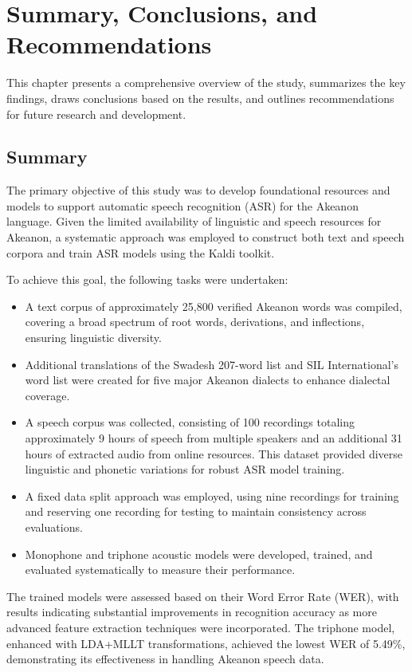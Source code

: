 \chapter{Summary, Conclusions, and Recommendations}

This chapter presents a comprehensive overview of the study, summarizes the key findings, draws conclusions based on the results, and outlines recommendations for future research and development.

\section{Summary}

The primary objective of this study was to develop foundational resources and models to support automatic speech recognition (ASR) for the Akeanon language. Given the limited availability of linguistic and speech resources for Akeanon, a systematic approach was employed to construct both text and speech corpora and train ASR models using the Kaldi toolkit.

To achieve this goal, the following tasks were undertaken:

\begin{itemize} \item A text corpus of approximately 25,800 verified Akeanon words was compiled, covering a broad spectrum of root words, derivations, and inflections, ensuring linguistic diversity. \item Additional translations of the Swadesh 207-word list and SIL International’s word list were created for five major Akeanon dialects to enhance dialectal coverage. \item A speech corpus was collected, consisting of 100 recordings totaling approximately 9 hours of speech from multiple speakers and an additional 31 hours of extracted audio from online resources. This dataset provided diverse linguistic and phonetic variations for robust ASR model training. \item A fixed data split approach was employed, using nine recordings for training and reserving one recording for testing to maintain consistency across evaluations. \item Monophone and triphone acoustic models were developed, trained, and evaluated systematically to measure their performance. \end{itemize}

The trained models were assessed based on their Word Error Rate (WER), with results indicating substantial improvements in recognition accuracy as more advanced feature extraction techniques were incorporated. The triphone model, enhanced with LDA+MLLT transformations, achieved the lowest WER of 5.49\%, demonstrating its effectiveness in handling Akeanon speech data.

